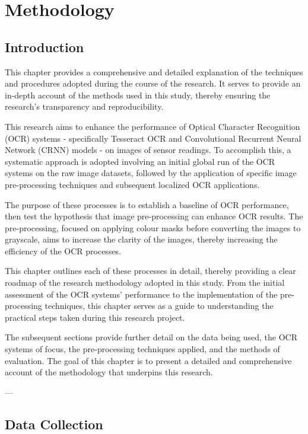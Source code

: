 \chapter{Methodology}
\label{chap:methodology}



\section{Introduction}



This chapter provides a comprehensive and detailed explanation of the techniques and procedures adopted during the course of the research. It serves to provide an in-depth account of the methods used in this study, thereby ensuring the research's transparency and reproducibility.

This research aims to enhance the performance of Optical Character Recognition (OCR) systems - specifically Tesseract OCR and Convolutional Recurrent Neural Network (CRNN) models - on images of sensor readings. To accomplish this, a systematic approach is adopted involving an initial global run of the OCR systems on the raw image datasets, followed by the application of specific image pre-processing techniques and subsequent localized OCR applications.

The purpose of these processes is to establish a baseline of OCR performance, then test the hypothesis that image pre-processing can enhance OCR results. The pre-processing, focused on applying colour masks before converting the images to grayscale, aims to increase the clarity of the images, thereby increasing the efficiency of the OCR processes.

This chapter outlines each of these processes in detail, thereby providing a clear roadmap of the research methodology adopted in this study. From the initial assessment of the OCR systems' performance to the implementation of the pre-processing techniques, this chapter serves as a guide to understanding the practical steps taken during this research project.

The subsequent sections provide further detail on the data being used, the OCR systems of focus, the pre-processing techniques applied, and the methods of evaluation. The goal of this chapter is to present a detailed and comprehensive account of the methodology that underpins this research.

---


\section{Data Collection}

